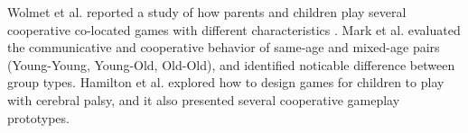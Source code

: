 Wolmet et al. reported a study of how parents and children play several cooperative co-located games with different characteristics \cite{CG5}. 
Mark et al. \cite{CG6} evaluated the communicative and cooperative behavior of same-age and mixed-age pairs (Young-Young, Young-Old, Old-Old), and identified noticable difference between group types. 
Hamilton et al. \cite{CG7} explored how to design games for children to play with cerebral palsy, and it also presented several cooperative gameplay prototypes.



